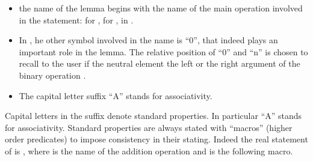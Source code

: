 \begin{itemize}
\item the name of the lemma begins with the name of the main operation
  involved in the statement:  for ,  for
  ,  in .
\item In , he other symbol involved in the name is ``0'',
that indeed plays an important role in the lemma.  The relative position
of ``0'' and ``n'' is chosen to recall to the user if the neutral element
 the left or the right argument of the binary operation .
\item The capital letter suffix ``A'' stands for associativity.
\end{itemize}








Capital letters in the suffix denote standard properties.
In particular ``A'' stands for associativity.  Standard properties are
always stated with ``macros'' (higher order predicates) to impose
consistency in their stating.  Indeed the real statement of
 is , where  is the
name of the addition operation and  is the
following macro.

